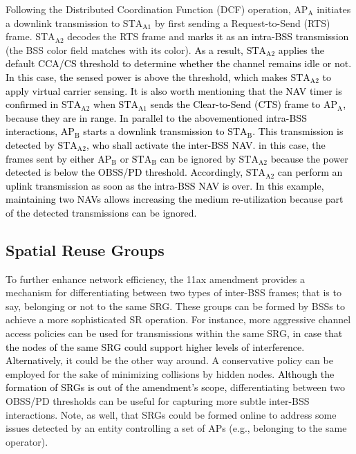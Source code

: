 \documentclass[preprint,12pt]{elsarticle}
\begin{document}
Following the Distributed Coordination Function (DCF) operation, $\text{AP}_\text{A}$ initiates a downlink transmission to $\text{STA}_\text{A1}$ by first sending a Request-to-Send (RTS) frame. $\text{STA}_\text{A2}$ decodes the RTS frame and \textcolor{black}{marks it as an intra-BSS transmission} (the BSS color field matches with its color). \textcolor{black}{As a result, $\text{STA}_\text{A2}$ applies the default CCA/CS threshold to determine whether the channel remains idle or not. In this case, the sensed power is above the threshold, which makes $\text{STA}_\text{A2}$ to apply virtual carrier sensing. It is also worth mentioning that the NAV timer is confirmed in $\text{STA}_\text{A2}$ when $\text{STA}_\text{A1}$ sends the Clear-to-Send (CTS) frame to $\text{AP}_\text{A}$, because they are in range. In parallel to the abovementioned intra-BSS interactions, $\text{AP}_\text{B}$ starts a downlink transmission to $\text{STA}_\text{B}$. This transmission is detected by $\text{STA}_\text{A2}$, who shall activate the inter-BSS NAV. in this case, the frames sent by either $\text{AP}_\text{B}$ or $\text{STA}_\text{B}$ can be ignored by $\text{STA}_\text{A2}$ because the power detected is below the OBSS/PD threshold. Accordingly, $\text{STA}_\text{A2}$ can perform an uplink transmission as soon as the intra-BSS NAV is over. In this example, maintaining two NAVs allows increasing the medium re-utilization because part of the detected transmissions can be ignored.}

\subsection{Spatial Reuse Groups}
\label{section:srg}
To further enhance network efficiency, the 11ax amendment provides a mechanism for differentiating between two types of inter-BSS frames; that is to say, belonging or not to the same SRG. These groups can be formed by BSSs to achieve a more sophisticated SR operation. For instance, more aggressive channel access policies can be used for transmissions within the same SRG, \textcolor{black}{in case that the nodes of the same SRG could support higher levels of interference}. \textcolor{black}{Alternatively}, it could be the other way around. A conservative policy can be employed for the sake of minimizing collisions by hidden nodes. \textcolor{black}{Although the formation of SRGs is out of the amendment's scope,} differentiating between two OBSS/PD thresholds can be useful for capturing more subtle inter-BSS interactions. Note, as well, that SRGs could be formed online to address some issues detected by an entity controlling a set of APs (e.g., belonging to the same operator).
\end{document}
